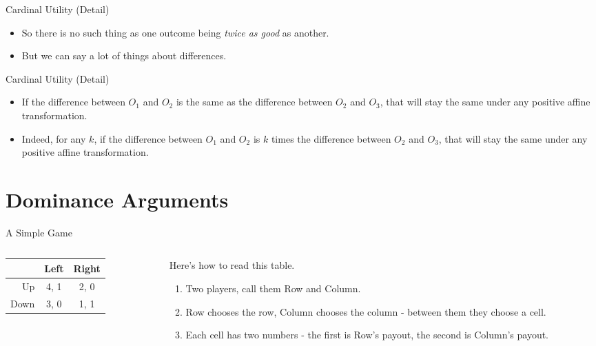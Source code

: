 \documentclass[
  14pt,
  letterpaper,
  ignorenonframetext,
  aspectratio=169,
]{beamer}
\providecommand{\tightlist}{%
  \setlength{\itemsep}{0pt}\setlength{\parskip}{0pt}}\usepackage{longtable,booktabs,array}
\let\olditem\item
\renewcommand{\item}{%
\olditem\vspace{6pt}}
\begin{document}
\begin{frame}{Cardinal Utility (Detail)}
\protect\hypertarget{cardinal-utility-detail-2}{}
\begin{itemize}[<+->]
\tightlist
\item
  So there is no such thing as one outcome being \emph{twice as good} as
  another.
\item
  But we can say a lot of things about differences.
\end{itemize}
\end{frame}

\begin{frame}{Cardinal Utility (Detail)}
\protect\hypertarget{cardinal-utility-detail-3}{}
\begin{itemize}[<+->]
\tightlist
\item
  If the difference between \(O_1\) and \(O_2\) is the same as the
  difference between \(O_2\) and \(O_3\), that will stay the same under
  any positive affine transformation.
\item
  Indeed, for any \(k\), if the difference between \(O_1\) and \(O_2\)
  is \(k\) times the difference between \(O_2\) and \(O_3\), that will
  stay the same under any positive affine transformation.
\end{itemize}
\end{frame}

\hypertarget{dominance-arguments}{%
\section{Dominance Arguments}\label{dominance-arguments}}

\begin{frame}{A Simple Game}
\protect\hypertarget{a-simple-game}{}
\begin{columns}[T]
\begin{column}{0.4\textwidth}
\begin{table}[!h]
\centering
\begin{tabular}[t]{>{}r|cc}
\toprule
 & Left & Right\\
\midrule
Up & 4, 1 & 2, 0\\
Down & 3, 0 & 1, 1\\
\bottomrule
\end{tabular}
\end{table}
\end{column}

\begin{column}{0.6\textwidth}
Here's how to read this table.

\begin{enumerate}
\tightlist
\item
  Two players, call them Row and Column.
\item
  Row chooses the row, Column chooses the column - between them they
  choose a cell.
\item
  Each cell has two numbers - the first is Row's payout, the second is
  Column's payout.
\end{enumerate}
\end{column}
\end{columns}
\end{frame}
\end{document}
